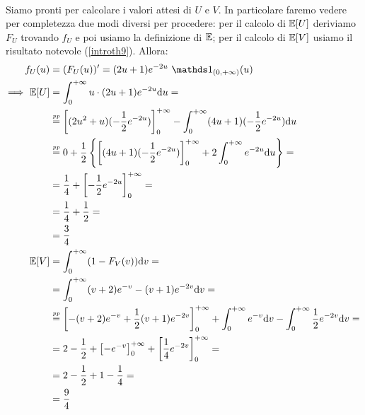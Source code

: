 \begin{enumerate}
\begin{gather*}
\end{gather*}
Siamo pronti per calcolare i valori attesi di $U$ e $V$. In particolare faremo vedere per completezza due modi diversi per procedere: per il calcolo di $\mathbb{E}[U]$ deriviamo $F_U$ trovando $f_U$ e poi usiamo la definizione di $\mathbb{E}$; per il calcolo di $\mathbb{E}[V]$ usiamo il risultato notevole (\ref{introth9}). Allora:
\begin{gather*}
\begin{aligned}
f_U(u)&=(F_U(u))'=(2u+1)e^{-2u}\ \Ind_{(0,+\infty)}(u) \\
\Longrightarrow\ \EE[U]&=\int_{0}^{+\infty} u\cdot (2u+1)e^{-2u}\du =\\
&\overset{\underset{pp}{}}{=}\left[(2u^2+u)(-\frac{1}{2}e^{-2u})   \right]_0^{+\infty} -\int_{0}^{+\infty} (4u+1)(-\frac{1}{2}e^{-2u})\du \\
&\overset{\underset{pp}{}}{=}0+\frac{1}{2}\left\{\left[(4u+1)(-\frac{1}{2}e^{-2u})  \right]_0^{+\infty}+2\int_{0}^{+\infty} e^{-2u}\du   \right\}=\\
&=\frac{1}{4}+\left[ -\frac{1}{2}e^{-2u} \right]_0^{+\infty}=\\
&=\frac{1}{4}+\frac{1}{2}=\\
&=\frac{3}{4} \\
\EE[V]&=\int_{0}^{+\infty} (1-F_V(v))\dv=\\
&=\int_{0}^{+\infty} (v+2)e^{-v}-(v+1)e^{-2v}\dv=\\
&\overset{\underset{pp}{}}{=}\left[-(v+2)e^{-v}+\frac{1}{2}(v+1)e^{-2v}  \right]_0^{+\infty}+\int_{0}^{+\infty} e^{-v}\dv-\int_{0}^{+\infty} \frac{1}{2}e^{-2v}\dv=\\
&=2-\frac{1}{2}+\left[-e^{-v}  \right]_0^{+\infty}  + \left[\frac{1}{4}e^{-2v}  \right]_0^{+\infty}=\\
&=2-\frac{1}{2}+1-\frac{1}{4}=\\
&=\frac{9}{4}
\end{aligned}
\end{gather*}
\end{enumerate}

